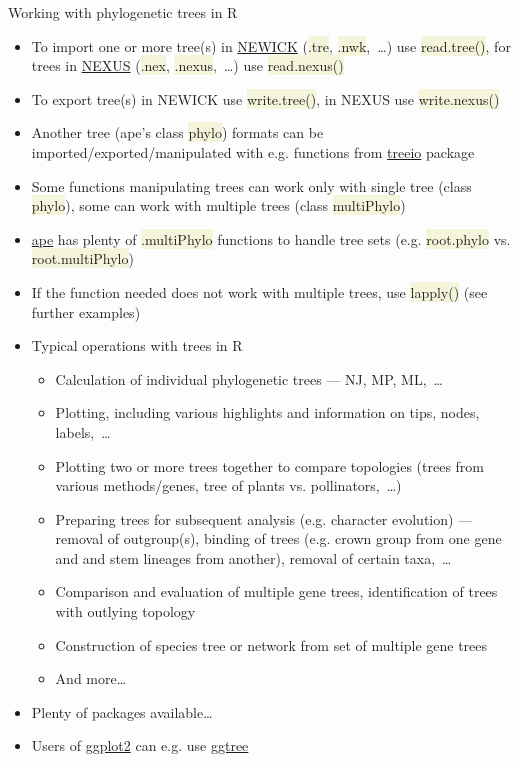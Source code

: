 \documentclass[compress, xelatex, 11pt, xcolor=svgnames, aspectratio=169,
	hyperref={
		bookmarks=true,
		unicode=true,
		colorlinks=true,
		pdftitle={Molecular data in R},
		plainpages=false,
		pdfauthor={Vojtech Zeisek},
		pdfsubject={Course about phylogeny and evolution in R},
		pdfcreator={XeLaTeX},
		pdfkeywords={R, evolution, phylogeny, molecular data},
		linkcolor=Crimson, %
		anchorcolor=Magenta, %
		citecolor=Magenta, %
		filecolor=Magenta, %
		menucolor=Magenta, %
		urlcolor=DodgerBlue, %
		},
	url={hyphens, lowtilde} %
	]{beamer}
\renewcommand{\texttt}[1]{\colorbox{Beige}{{\ttfamily #1}}}
\begin{document}
\begin{frame}[allowframebreaks]{Working with phylogenetic trees in R}
	\begin{itemize}
		\item To import one or more tree(s) in \href{https://en.wikipedia.org/wiki/Newick_format}{NEWICK} (\texttt{*.tre}, \texttt{*.nwk},~\ldots) use \texttt{read.tree()}, for trees in \href{https://en.wikipedia.org/wiki/Nexus_file}{NEXUS} (\texttt{*.nex}, \texttt{*.nexus},~\ldots) use \texttt{read.nexus()}
		\item To export tree(s) in NEWICK use \texttt{write.tree()}, in NEXUS use \texttt{write.nexus()}
		\item Another tree (ape's class \texttt{phylo}) formats can be imported/exported/manipulated with e.g. functions from \href{https://bioconductor.org/packages/release/bioc/html/treeio.html}{treeio} package
		\item Some functions manipulating trees can work only with single tree (class \texttt{phylo}), some can work with multiple trees (class \texttt{multiPhylo})
		\item \href{https://CRAN.R-project.org/package=ape}{ape} has plenty of \texttt{*.multiPhylo} functions to handle tree sets (e.g. \texttt{root.phylo} vs. \texttt{root.multiPhylo})
		\item If the function needed does not work with multiple trees, use \texttt{lapply()} (see further examples)
		\item Typical operations with trees in R
		\begin{itemize}
			\item Calculation of individual phylogenetic trees --- NJ, MP, ML,~\ldots
			\item Plotting, including various highlights and information on tips, nodes, labels,~\ldots
			\item Plotting two or more trees together to compare topologies (trees from various methods/genes, tree of plants vs. pollinators,~\ldots)
			\item Preparing trees for subsequent analysis (e.g. character evolution) --- removal of outgroup(s), binding of trees (e.g. crown group from one gene and and stem lineages from another), removal of certain taxa,~\ldots
			\item Comparison and evaluation of multiple gene trees, identification of trees with outlying topology
			\item Construction of species tree or network from set of multiple gene trees
			\item And more\ldots
		\end{itemize}
		\item Plenty of packages available\ldots
		\item Users of \href{https://ggplot2.tidyverse.org/}{ggplot2} can e.g. use \href{https://bioconductor.org/packages/release/bioc/html/ggtree.html}{ggtree}
	\end{itemize}
\end{frame}
\end{document}
